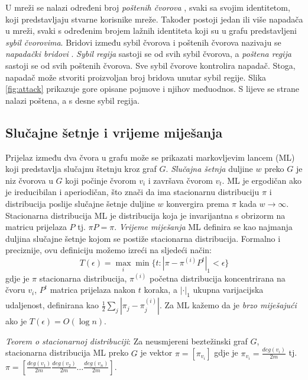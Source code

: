 \documentclass[times, utf8, seminar, numeric]{fer}
\begin{document}
U mreži se nalazi određeni broj \textit{poštenih čvorova} , svaki sa svojim identitetom, koji predstavljaju stvarne korisnike mreže. Također postoji jedan ili više napadača u mreži, svaki s određenim brojem lažnih identiteta koji su u grafu predstavljeni \textit{sybil čvorovima}. Bridovi između sybil čvorova i poštenih čvorova nazivaju se \textit{napadački bridovi} . \textit{Sybil regija}  sastoji se od svih sybil čvorova, a \textit{poštena regija}  sastoji se od svih poštenih čvorova. Sve sybil čvorove kontrolira napadač. Stoga, napadač može stvoriti proizvoljan broj bridova unutar sybil regije. Slika \ref{fig:attack} prikazuje gore opisane pojmove i njihov međuodnos. S lijeve se strane nalazi poštena, a s desne sybil regija.

\subsection{Slučajne šetnje i vrijeme miješanja}
Prijelaz između dva čvora u grafu može se prikazati markovljevim lancem (ML) koji predstavlja slučajnu štetnju kroz graf $G$. \textit{Slučajna šetnja} duljine $w$ preko $G$ je niz čvorova u $G$ koji počinje čvorom $v_i$ i završava čvorom $v_t$. ML je ergodičan  ako je ireducibilan i aperiodičan, što znači da ima stacionarnu distribuciju $\pi$ i distribucija poslije slučajne šetnje duljine $w$ konvergira prema $\pi$ kada $w \to \infty$. Stacionarna distribucija ML je distribucija koja je invarijantna s obrizorm na matricu prijelaza $P$ tj. $\pi P = \pi$. \textit{Vrijeme miješanja}  ML definira se kao najmanja duljina slučajne šetnje kojom se postiže stacionarna distribucija. Formalno i preciznije, ovu definiciju možemo izreći na sljedeći način:
\begin{equation} \label{eq:mixing}
  T(\epsilon) = \max_{i} \min \{t : |\pi - \pi^{(i)} P^t|_1 < \epsilon\}
\end{equation}
gdje je $\pi$ stacionarna distribucija, $\pi^{(i)}$ početna distribucija koncentrirana na čvoru $v_i$, $P^t$ matrica prijelaza nakon $t$ koraka, a $|\cdot|_1$ ukupna varijacijska udaljenost, definirana kao $\frac{1}{2} \sum_{j} |\pi_j - \pi_j^{(i)}|$. Za ML kažemo da je \textit{brzo miješajući}  ako je $T(\epsilon) = O(\log n)$. \cite{friends} 

\textit{Teorem o stacionarnoj distribuciji}: Za neusmjereni beztežinski graf $G$, stacionarna distribucija ML preko $G$ je vektor $\pi = [\pi_{v_i}]$ gdje je $\pi_{v_i} = \frac{deg (v_i)}{2 m}$ tj. $\pi = [\frac{deg (v_1)}{2 m} \frac{deg (v_2)}{2 m} \dots \frac{deg (v_n)}{2 m}]$.
\end{document}
